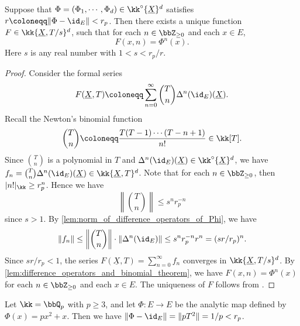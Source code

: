     \begin{theorem}\label{prop:Poonen14_p-adic_interpolation_of_iterates}
        Suppose that \(\Phi = (\Phi_1,\cdots,\Phi_d)\in \kk^\circ\{ \underline{X} \}^d\) satisfies \(r \coloneqq \|\Phi - \id_E\| < r_p\).
        Then there exists a unique function \(F \in \kk\{ \underline{X}, T/s \}^d\), such that for each \(n \in \bbZ_{\geq 0}\) and each \(x \in E\),
        \[F(x, n) = \Phi^n(x).\]
        Here \(s\) is any real number with \(1 < s < r_p/r\).
    \end{theorem}
    \begin{proof}
        Consider the formal series
        \[ F(\underline{X}, T) \coloneqq \sum_{n=0}^\infty \binom{T}{n} \Delta^n(\id_E)(\underline{X}). \]
        Recall the Newton's binomial function
        \[ \binom{T}{n} \coloneqq \frac{T(T-1)\cdots(T-n+1)}{n!} \in \kk[T]. \]
        Since \(\binom{T}{n}\) is a polynomial in \(T\) and \(\Delta^n(\id_E)(\underline{X}) \in \kk^\circ\{\underline{X}\}^d\),
        we have \(f_n = \binom{T}{n} \Delta^n(\id_E)(\underline{X}) \in \kk\{\underline{X}, T\}^d\).
        Note that for each \(n \in \bbZ_{\geq 0}\), then \(|n!|_{\kk} \geq r_p^n\).
        Hence we have
        \[ \left\|\binom{T}{n}\right\| \leq s^n r_p^{-n} \]
        since \(s > 1\).
        By \cref{lem:norm_of_difference_operators_of_Phi}, we have
        \[ \|f_n\| \leq \left\| \binom{T}{n} \right\| \cdot \|\Delta^n(\id_E)\| \leq s^n r_p^{-n} r^n = (s r / r_p)^n. \]
        Since \(s r / r_p < 1\), the series \(F(\underline{X}, T) = \sum_{n=0}^\infty f_n\) converges in \(\kk\{\underline{X}, T/s\}^d\).
        By \cref{lem:difference_operators_and_binomial_theorem}, we have \(F(x, n) = \Phi^n(x)\) for each \(n \in \bbZ_{\geq 0}\) and each \(x \in E\).
        The uniqueness of \(F\) follows from .
    \end{proof}


    \begin{example}
        Let \(\kk = \bbQ_p\) with \(p \geq 3\), and let \(\Phi \colon E \to E\) be the analytic map defined by \(\Phi(x) = px^2+x\).
        Then we have \(\|\Phi - \id_E\| = \|pT^2\| = 1/p < r_p\).
    \end{example}


